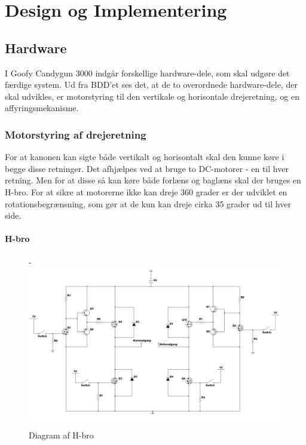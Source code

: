 \chapter{Design og Implementering}

\section{Hardware}
I Goofy Candygun 3000 indgår forskellige hardware-dele, som skal udgøre det færdige system. Ud fra BDD'et ses det, at de to overordnede hardware-dele, der skal udvikles, er motorstyring til den vertikale og horisontale drejeretning, og en affyringsmekanisme. 

\subsection{Motorstyring af drejeretning}
For at kanonen kan sigte både vertikalt og horisontalt skal den kunne køre i begge disse retninger. Det afhjælpes ved at bruge to DC-motorer - en til hver retning. Men for at disse så kan køre både forlæns og baglæns skal der bruges en H-bro. For at sikre at motorerne ikke kan dreje 360 grader er der udviklet en rotationsbegrænsning, som gør at de kun kan dreje cirka 35 grader ud til hver side. 

\subsubsection{H-bro}


\begin{figure}[H]
	\begin{adjustwidth}{-3cm}{-\rightmargin}
	\centering
	\includegraphics[width=0.9\paperwidth]{Afsnit/DesignOgImplementering/images/H-bro}
	\caption{Diagram af H-bro}
	\label{fig:hbro}
	\end{adjustwidth}
\end{figure}


